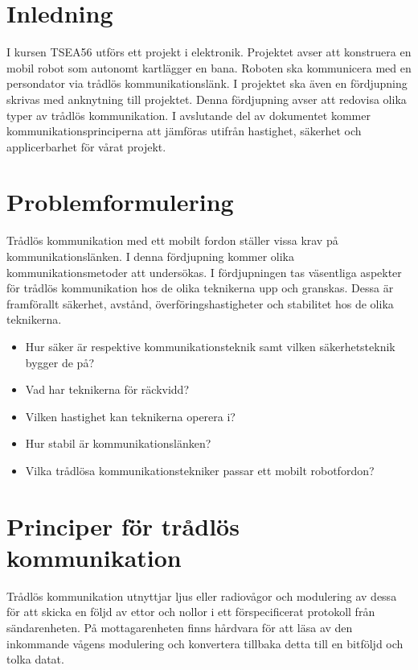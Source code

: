 \documentclass[a4paper,12pt,fleqn]{article}
\begin{document}
\addto\captionsswedish{\renewcommand{\contentsname}{Innehållsförteckning}}

\tableofcontents
\thispagestyle{fancy}
\newpage

\section{Inledning}
I kursen TSEA56 utförs ett projekt i elektronik. Projektet avser att konstruera en mobil robot som autonomt kartlägger en bana. Roboten ska kommunicera med en persondator via trådlös kommunikationslänk. I projektet ska även en fördjupning skrivas med anknytning till projektet. Denna fördjupning avser att redovisa olika typer av trådlös kommunikation. I avslutande del av dokumentet kommer kommunikationsprinciperna att jämföras utifrån hastighet, säkerhet och applicerbarhet för vårat projekt. 

\section{Problemformulering}
Trådlös kommunikation med ett mobilt fordon ställer vissa krav på kommunikationslänken. I denna fördjupning kommer olika kommunikationsmetoder att undersökas. I fördjupningen tas väsentliga aspekter för trådlös kommunikation hos de olika teknikerna upp och granskas. Dessa är framförallt säkerhet, avstånd, överföringshastigheter och stabilitet hos de olika teknikerna. 
\begin{itemize}
\item Hur säker är respektive kommunikationsteknik samt vilken säkerhetsteknik bygger de på?
\item Vad har teknikerna för räckvidd?
\item Vilken hastighet kan teknikerna operera i?
\item Hur stabil är kommunikationslänken?
\item Vilka trådlösa kommunikationstekniker passar ett mobilt robotfordon?
\end{itemize}
\newpage

\section{Principer för trådlös kommunikation}

Trådlös kommunikation utnyttjar ljus eller radiovågor och modulering av dessa för att skicka en följd av ettor och nollor i ett förspecificerat protokoll från sändarenheten. På mottagarenheten finns hårdvara för att läsa av den inkommande vågens modulering och konvertera tillbaka detta till en bitföljd och tolka datat. 
\end{document}
